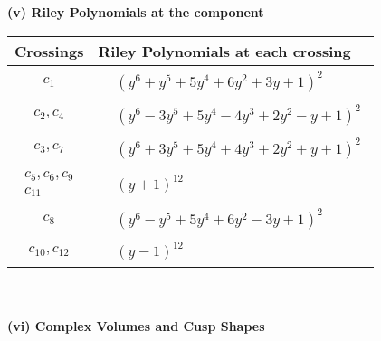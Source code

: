 \documentclass[1p]{elsarticle_modified}
\theoremstyle{definition}
\begin{document}
\flushleft \textbf{(v) Riley Polynomials at the component}\newline \\
\begin{tabular}{m{50pt}|m{274pt}}
Crossings & \hspace{64pt}Riley Polynomials at each crossing \\
\hline $$\begin{aligned}c_{1}\end{aligned}$$&$\begin{aligned}
&(y^6+y^5+5 y^4+6 y^2+3 y+1)^2
\end{aligned}$\\
\hline $$\begin{aligned}c_{2},c_{4}\end{aligned}$$&$\begin{aligned}
&(y^6-3 y^5+5 y^4-4 y^3+2 y^2- y+1)^2
\end{aligned}$\\
\hline $$\begin{aligned}c_{3},c_{7}\end{aligned}$$&$\begin{aligned}
&(y^6+3 y^5+5 y^4+4 y^3+2 y^2+y+1)^2
\end{aligned}$\\
\hline $$\begin{aligned}c_{5},c_{6},c_{9}\\c_{11}\end{aligned}$$&$\begin{aligned}
&(y+1)^{12}
\end{aligned}$\\
\hline $$\begin{aligned}c_{8}\end{aligned}$$&$\begin{aligned}
&(y^6- y^5+5 y^4+6 y^2-3 y+1)^2
\end{aligned}$\\
\hline $$\begin{aligned}c_{10},c_{12}\end{aligned}$$&$\begin{aligned}
&(y-1)^{12}
\end{aligned}$\\
\hline
\end{tabular}\\~\\
\newpage\flushleft \textbf{(vi) Complex Volumes and Cusp Shapes}
\end{document}
